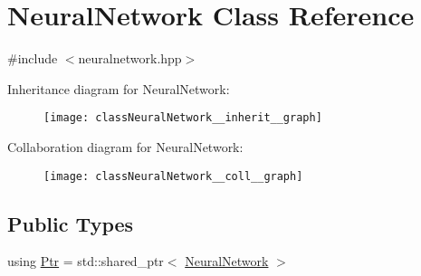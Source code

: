 \hypertarget{classNeuralNetwork}{}\section{Neural\+Network Class Reference}
\label{classNeuralNetwork}


{\ttfamily \#include $<$neuralnetwork.\+hpp$>$}



Inheritance diagram for Neural\+Network\+:
\nopagebreak
\begin{figure}[H]
\begin{center}
\leavevmode
\texttt{[image: classNeuralNetwork\_\_inherit\_\_graph]}
\end{center}
\end{figure}


Collaboration diagram for Neural\+Network\+:
\nopagebreak
\begin{figure}[H]
\begin{center}
\leavevmode
\texttt{[image: classNeuralNetwork\_\_coll\_\_graph]}
\end{center}
\end{figure}
\subsection*{Public Types}
\begin{DoxyCompactItemize}
\item 
using \hyperlink{classNeuralNetwork_a31de381df65f261fd0f38e0559995d1a}{Ptr} = std\+::shared\+\_\+ptr$<$ \hyperlink{classNeuralNetwork}{Neural\+Network} $>$
\end{DoxyCompactItemize}

